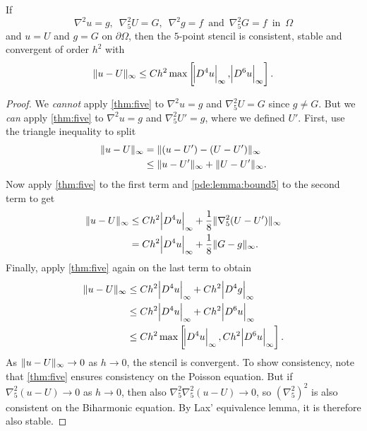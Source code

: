 \begin{theorem}
If 
$$ \nabla^2 u = g, \,\,\, \nabla_5^2 U = G, \,\,\, \nabla^2 g = f \,\,\, \text{and} \,\,\, \nabla_5^2 G = f \,\,\, \text{in} \,\,\, \Omega $$
and $u=U$ and $g=G$ on $\partial \Omega$,
then the $5$-point stencil is consistent, stable and convergent of order $h^2$ with
\begin{equation*}
	\lVert u-U \rVert_\infty \leq Ch^2 \max \left[ \abs{D^4 u}_\infty, \abs{D^6 u}_\infty \right].
\end{equation*}
\label{pde:lemma:fivebi}
\end{theorem}
\begin{proof}
We \emph{cannot} apply \cref{thm:five} to $\nabla^2 u = g$ and $\nabla_5^2 U = G$ since $g \neq G$.
But we \emph{can} apply \cref{thm:five} to $\nabla^2 u = g$ and $\nabla_5^2 U' = g$, where we defined $U'$.
First, use the triangle inequality to split
\begin{equation*}
\begin{split}
	\lVert u-U \rVert_\infty &= \lVert (u-U') - (U-U') \rVert_\infty \\
                &\leq \lVert u-U' \rVert_\infty + \lVert U-U' \rVert_\infty.\\
\end{split}
\end{equation*}
Now apply \cref{thm:five} to the first term and \cref{pde:lemma:bound5} to the second term to get
\begin{equation*}
\begin{split}
	\lVert u-U \rVert_\infty &\leq Ch^2 \abs{D^4 u}_\infty + \frac18 \lVert \nabla_5^2(U-U') \rVert_\infty \\
				&=    Ch^2 \abs{D^4 u}_\infty + \frac18 \lVert G-g \rVert_\infty. \\
\end{split}
\end{equation*}
Finally, apply \cref{thm:five} again on the last term to obtain
\begin{equation*}
\begin{split}
	\lVert u-U \rVert_\infty &\leq Ch^2 \abs{D^4 u}_\infty + Ch^2 \abs{D^4 g}_\infty \\
	            &\leq Ch^2 \abs{D^4 u}_\infty + Ch^2 \abs{D^6 u}_\infty \\
	            &\leq Ch^2 \max \left[ \abs{D^4 u}_\infty,  Ch^2 \abs{D^6 u}_\infty \right]. \\
\end{split}
\end{equation*}
As $\lVert u-U \rVert_\infty \rightarrow 0$ as $h \rightarrow 0$, the stencil is convergent.
To show consistency, note that \cref{thm:five} ensures consistency on the Poisson equation.
But if $\nabla_5^2(u-U) \rightarrow 0$ as $h \rightarrow 0$, then also $\nabla_5^2 \nabla_5^2 (u-U) \rightarrow 0$, so $(\nabla_5^2)^2$ is also consistent on the Biharmonic equation.
By Lax' equivalence lemma, it is therefore also stable.
\end{proof}


